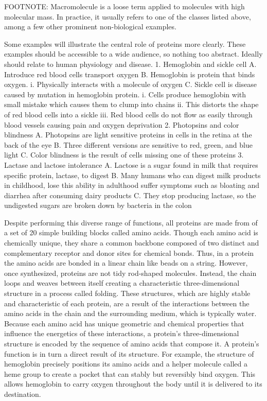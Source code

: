 FOOTNOTE: Macromolecule is a loose term applied to molecules with high molecular mass. In practice, it usually refers to one of the classes listed above, among a few other prominent non-biological examples.

Some examples will illustrate the central role of proteins more clearly.
These examples should be accessible to a wide audience, so nothing too abstract. Ideally should relate to human physiology and disease.
    1. Hemoglobin and sickle cell
        A. Introduce red blood cells transport oxygen
        B. Hemoglobin is protein that binds oxygen.
            i. Physically interacts with a molecule of oxygen
        C. Sickle cell is disease caused by mutation in hemoglobin protein.
            i. Cells produce hemoglobin with small mistake which causes them to clump into chains
            ii. This distorts the shape of red blood cells into a sickle
            iii. Red blood cells do not flow as easily through blood vessels causing pain and oxygen deprivation
    2. Photopsins and color blindness
        A. Photopsins are light sensitive proteins in cells in the retina at the back of the eye
        B. Three different versions are sensitive to red, green, and blue light
        C. Color blindness is the result of cells missing one of these proteins
    3. Lactase and lactose intolerance
        A. Lactose is a sugar found in milk that requires specific protein, lactase, to digest
        B. Many humans who can digest milk products in childhood, lose this ability in adulthood suffer symptoms such as bloating and diarrhea after consuming dairy products
        C. They stop producing lactase, so the undigested sugars are broken down by bacteria in the colon

Despite performing this diverse range of functions, all proteins are made from of a set of 20 simple building blocks called amino acids. Though each amino acid is chemically unique, they share a common backbone composed of two distinct and complementary receptor and donor sites for chemical bonds. Thus, in a protein the amino acids are bonded in a linear chain like beads on a string. However, once synthesized, proteins are not tidy rod-shaped molecules. Instead, the chain loops and weaves between itself creating a characteristic three-dimensional structure in a process called folding. These structures, which are highly stable and characteristic of each protein, are a result of the interactions between the amino acids in the chain and the surrounding medium, which is typically water. Because each amino acid has unique geometric and chemical properties that influence the energetics of these interactions, a protein's three-dimensional structure is encoded by the sequence of amino acids that compose it. A protein's function is in turn a direct result of its structure. For example, the structure of hemoglobin precisely positions its amino acids and a helper molecule called a heme group to create a pocket that can stably but reversibly bind oxygen. This allows hemoglobin to carry oxygen throughout the body until it is delivered to its destination.

